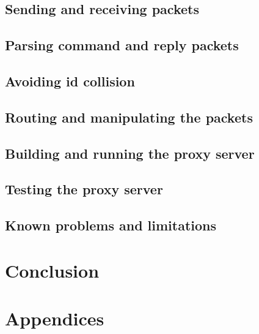 \documentclass{style/bachelor-thesis}
\begin{document}
\subsection{Sending and receiving packets}
\label{sec:impl_io}


\subsection{Parsing command and reply packets}
\label{sec:impl_parsing}


\subsection{Avoiding id collision}
\label{sec:impl_id}


\subsection{Routing and manipulating the packets}
\label{sec:impl_routing}


\subsection{Building and running the proxy server}
\label{sec:impl_buildrun}


\subsection{Testing the proxy server}
\label{sec:impl_test}


\subsection{Known problems and limitations}
\label{sec:impl_limitations}


\clearpage
\section{Conclusion} 



\newpage

{}


\newpage

\appendix
\section*{Appendices}
\renewcommand{\thesubsection}{\Alph{subsection}}

\pagebreak
\end{document}
